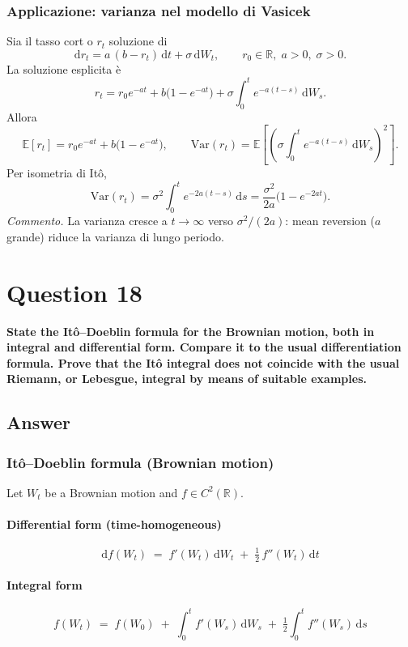 \documentclass[12pt,a4paper]{book}
\theoremstyle{remark}
\newcommand{\EE}{\mathbb{E}}          %
\newcommand{\RR}{\mathbb{R}}
\newcommand{\Var}{\mathrm{Var}}       %
\newcommand{\dd}{\mathrm{d}}
\begin{document}
\subsubsection*{Applicazione: varianza nel modello di Vasicek}
Sia il tasso cort o $r_t$ soluzione di
\[
\dd r_t = a\,(b-r_t)\,\dd t + \sigma\,\dd W_t,\qquad r_0 \in\RR,\; a>0,\; \sigma>0.
\]
La soluzione esplicita \`e
\[
r_t = r_0 e^{-at} + b\big(1-e^{-at}\big) + \sigma \int_0^t e^{-a(t-s)}\,\dd W_s.
\]
Allora
\[
\EE[r_t] = r_0 e^{-at} + b\big(1-e^{-at}\big),
\qquad
\Var(r_t) = \EE\!\left[\left(\sigma \int_0^t e^{-a(t-s)}\,\dd W_s\right)^{\!2}\right].
\]
Per isometria di It\^o,
\[
\Var(r_t) = \sigma^2 \int_0^t e^{-2a(t-s)}\,\dd s
= \frac{\sigma^2}{2a}\Big(1-e^{-2at}\Big).
\]
\textit{Commento.} La varianza cresce a $t\!\to\!\infty$ verso $\sigma^2/(2a)$: mean reversion ($a$ grande) riduce la varianza di lungo periodo.


\newpage
\section{Question 18}
\textbf{State the It\^o--Doeblin formula for the Brownian motion, both in integral and differential form. Compare it to the usual differentiation formula. Prove that the It\^o integral does not coincide with the usual Riemann, or Lebesgue, integral by means of suitable examples.}

\subsection*{Answer}

\subsubsection*{It\^o--Doeblin formula (Brownian motion)}
Let $W_t$ be a Brownian motion and $f\in C^2(\RR)$.

\paragraph{Differential form (time-homogeneous)}
\[
\boxed{\; \dd f(W_t) \;=\; f'(W_t)\,\dd W_t \;+\; \tfrac12\,f''(W_t)\,\dd t \;}
\]

\paragraph{Integral form}
\[
\boxed{\; f(W_t) \;=\; f(W_0) \;+\; \int_0^t f'(W_s)\,\dd W_s \;+\; \tfrac12\int_0^t f''(W_s)\,\dd s \;}
\]
\end{document}
